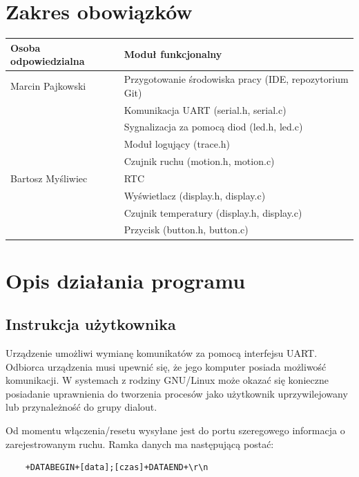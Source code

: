 \documentclass{article}
\begin{document}
\newpage
\section{Zakres obowiązków}

\begin{tabular}{|l|l|}
    \hline
    Osoba odpowiedzialna & Moduł funkcjonalny\\
    \hline
    Marcin Pajkowski
    & Przygotowanie środowiska pracy (IDE, repozytorium Git)\\
    & Komunikacja UART (serial.h, serial.c)\\
    & Sygnalizacja za pomocą diod (led.h, led.c)\\
    & Moduł logujący (trace.h)\\
    & Czujnik ruchu (motion.h, motion.c)\\
    \hline
    Bartosz Myśliwiec
    & RTC\\
    & Wyświetlacz (display.h, display.c)\\
    & Czujnik temperatury (display.h, display.c)\\
    & Przycisk (button.h, button.c)\\
    \hline
\end{tabular}


\section{Opis działania programu}
\subsection{Instrukcja użytkownika}

Urządzenie umożliwi wymianę komunikatów za pomocą interfejsu UART. Odbiorca urządzenia
musi upewnić się, że jego komputer posiada możliwość komunikacji. W systemach
z rodziny GNU/Linux może okazać się konieczne posiadanie uprawnienia do tworzenia
procesów jako użytkownik uprzywilejowany lub przynależność do grupy dialout.

Od momentu włączenia/resetu wysyłane jest do portu szeregowego informacja o zarejestrowanym
ruchu. Ramka danych ma następującą postać:

\begin{lstlisting}
    +DATABEGIN+[data];[czas]+DATAEND+\r\n
\end{lstlisting}
\end{document}
